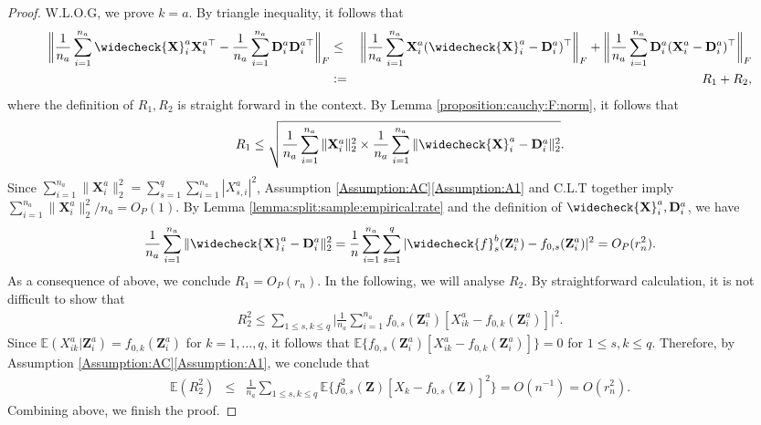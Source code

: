 \documentclass[11pt, preprint]{imsart}
\numberwithin{equation}{section}
\def \bfD{\mathbf{D}}
\def \bfX{\mathbf{X}}
\def \bfZ{\mathbf{Z}}
\def \bfD{\mathbf{D}}
\def \ev{\mathbb{E}}
\theoremstyle{plain}
\theoremstyle{definition}
\begin{document}
\begin{proof}
W.L.O.G, we prove $k=a$. By triangle inequality, it follows that
\begin{eqnarray*}
	\bigg\|\frac{1}{n_a}\sum_{i=1}^{n_a}\widecheck{\bfX}_i^a{\bfX}_i^{a\top}-\frac{1}{n_a}\sum_{i=1}^{n_a}\bfD_i^a\bfD_i^{a\top}\bigg\|_F\nonumber&\leq&\bigg\|\frac{1}{n_a}\sum_{i=1}^{n_a}{\bfX}_i^a(\widecheck{\bfX}_i^a-\bfD_i^a)^{\top}\bigg\|_F+\bigg\|\frac{1}{n_a}\sum_{i=1}^{n_a}{\bfD}_i^a({\bfX}_i^a-\bfD_i^a)^\top\bigg\|_F\nonumber\\
	&:=&R_1+R_2,
\end{eqnarray*}
where the definition of $R_1, R_2$ is straight forward in the context. By Lemma \ref{proposition:cauchy:F:norm}, it follows that
\begin{eqnarray}
	R_1\leq \sqrt{\frac{1}{n_a}\sum_{i=1}^{n_a}\|\bfX_i^a\|_2^2\times \frac{1}{n_a}\sum_{i=1}^{n_a}\|\widecheck{\bfX}_i^a-\bfD_i^a\|_2^2}.\nonumber
\end{eqnarray}
Since $\sum_{i=1}^{n_a}\|\bfX_i^a\|_2^2=\sum_{s=1}^q \sum_{i=1}^{n_a}|X_{s,i}^{a}|^2$, Assumption \ref{Assumption:AC}\ref{Assumption:A1} and C.L.T together imply $\sum_{i=1}^{n_a}\|\bfX_i^a\|_2^2/n_a=O_P(1)$. By Lemma \ref{lemma:split:sample:empirical:rate} and the definition of $\widecheck{\bfX}_i^a, \bfD_i^a$,  we have
\begin{eqnarray}
\frac{1}{n_a}\sum_{i=1}^{n_a}\|\widecheck{\bfX}_i^a-\bfD_i^a\|_2^2=\frac{1}{n}\sum_{i=1}^{n_a}\sum_{s=1}^{q}|\widecheck{f}_{s}^b(\bfZ_i^a)-f_{0,s}(\bfZ_i^a)|^2=O_P(r_n^2).\nonumber
\end{eqnarray} 
As a consequence of above, we conclude $R_1=O_P(r_n)$. In the following, we will analyse $R_2$. By straightforward calculation, it is not difficult to show that
\begin{eqnarray*}
	R_2^2\leq \sum_{1\leq s, k\leq q}\bigg|\frac{1}{n_a}\sum_{i=1}^{n_a} f_{0,s}(\bfZ_i^a)[X_{ik}^a-f_{0,k}(\bfZ_i^a)]\bigg|^2.
\end{eqnarray*}
Since $\ev(X_{ik}^a|\bfZ_i^a)=f_{0,k}(\bfZ_i^a)$ for $k=1,\ldots, q$, it follows that $\ev\{f_{0,s}(\bfZ_i^a)[X_{ik}^a-f_{0,k}(\bfZ_i^a)]\}=0$ for $1\leq s, k\leq q$. Therefore, by Assumption \ref{Assumption:AC}\ref{Assumption:A1}, we conclude that
\begin{eqnarray*}
\ev(R_2^2)&\leq& \frac{1}{n_a}\sum_{1\leq s,k\leq q}\ev\{f_{0,s}^2(\bfZ)[X_k-f_{0,s}(\bfZ)]^2\}=O(n^{-1})=O(r_n^2).
\end{eqnarray*}
Combining above, we finish the proof.
\end{proof}
\end{document}

